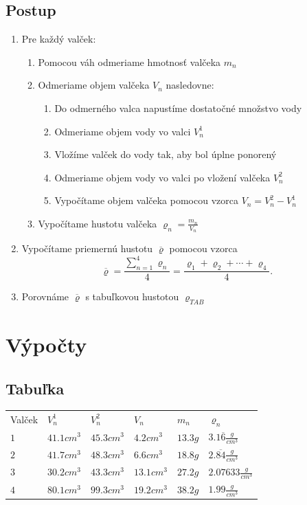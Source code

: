 \documentclass{article}
\begin{document}
\subsection{Postup}
\begin {enumerate}
\item  Pre každý valček:
\begin{enumerate}
\item   Pomocou váh odmeriame hmotnosť valčeka $m_n$
\item   Odmeriame objem valčeka $V_n$ nasledovne:
\begin{enumerate}
\item    Do odmerného valca napustíme dostatočné množstvo vody
\item    Odmeriame objem vody vo valci $V_n^1$
\item    Vložíme valček do vody tak, aby bol úplne ponorený
\item    Odmeriame objem vody vo valci po vložení valčeka $V_n^2$
\item    Vypočítame objem valčeka pomocou vzorca $V_n=V_n^2-V_n^1$
\end{enumerate}
\item   Vypočítame hustotu valčeka $\varrho_n=\frac{m_n}{V_n}$
\end{enumerate}
\item  Vypočítame priemernú hustotu 
	$  \overline{ \varrho}$ pomocou vzorca 
	\[
		\overline{ \varrho}=\frac{ \displaystyle \sum _{n=1} ^{ 4} \varrho_n}{4}=\frac{ \varrho_1+\varrho_2+\cdots+\varrho_4}{ 4}.
	\] 
\item Porovnáme $ \overline{ \varrho}$ s tabuľkovou hustotou $\varrho_{TAB}$
\end{enumerate}
\section{Výpočty}
\subsection{Tabuľka}
\begin{center}
\begin{tabular}{  p{1cm}  p{2cm}  p{2cm}  p{2cm}  p{2cm}  p{2cm} }
	\rowcolor{r}
	Valček & $V_n^1$ & $V_n^2$ & $V_n$ & $m_n$ & $\varrho_n$ \\
	\rowcolor{g} 
	$1$ & $41.1 cm^3$ & $45.3 cm^3$ & $4.2 cm^3$ & $13.3 g$ & $3.1\overline{6} \frac{g}{cm^3}$ \\
	\rowcolor{r}
	$2$ & $41.7 cm^3$ & $48.3 cm^3$ & $6.6 cm^3$ & $18.8 g$ & $2.\overline{84} \frac{g}{cm^3}$ \\
	\rowcolor{g}
	$3$ & $30.2 cm^3$ & $43.3 cm^3$ & $13.1 cm^3$ & $27.2 g$ & $2.07633 \frac{g}{cm^3}$ \\
	\rowcolor{r}
	$4$ & $80.1 cm^3$ & $99.3 cm^3$ & $19.2 cm^3$ & $38.2 g$ & $1.99 \frac{g}{cm^3}$ \\
	
\end{tabular}
\end{center}
\end{document}
